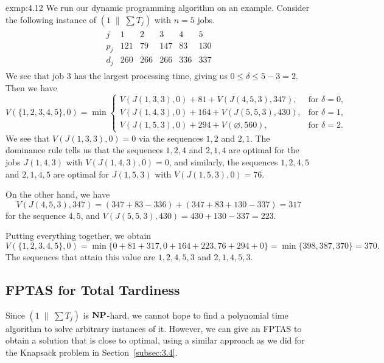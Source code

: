 \begin{exmp}{exmp:4.12}
    We run our dynamic programming algorithm on an example. Consider 
    the following instance of $(1\;\|\;\sum T_j)$ with $n = 5$ jobs. 
    \begin{align*}
        \begin{array}{c|ccccc}
            j & 1 & 2 & 3 & 4 & 5 \\ \hline 
            p_j & 121 & 79 & 147 & 83 & 130 \\ 
            d_j & 260 & 266 & 266 & 336 & 337 
        \end{array}
    \end{align*}
    We see that job $3$ has the largest processing time, giving us 
    $0 \leq \delta \leq 5 - 3 = 2$. Then we have 
    \[ V(\{1, 2, 3, 4, 5\}, 0) = \min\begin{cases} 
        V(J(1, 3, 3), 0) + 81 + V(J(4, 5, 3), 347), & \text{for } \delta = 0, \\ 
        V(J(1, 4, 3), 0) + 164 + V(J(5, 5, 3), 430), & \text{for } \delta = 1, \\ 
        V(J(1, 5, 3), 0) + 294 + V(\varnothing, 560), & \text{for } \delta = 2. 
    \end{cases} \] 
    We see that $V(J(1, 3, 3), 0) = 0$ via the sequences $1, 2$ and $2, 1$. 
    The dominance rule tells us that the sequences $1, 2, 4$ and $2, 1, 4$ 
    are optimal for the jobs $J(1, 4, 3)$ with $V(J(1, 4, 3), 0) = 0$, 
    and similarly, the sequences $1, 2, 4, 5$ and $2, 1, 4, 5$ are optimal for 
    $J(1, 5, 3)$ with $V(J(1, 5, 3), 0) = 76$.

    On the other hand, we have 
    \[ V(J(4, 5, 3), 347) = (347 + 83 - 336) + (347 + 83 + 130 - 337) = 317 \] 
    for the sequence $4, 5$, and $V(J(5, 5, 3), 430) = 430 + 130 - 337 = 223$.

    Putting everything together, we obtain 
    \[ V(\{1, 2, 3, 4, 5\}, 0) = 
    \min\{0 + 81 + 317, 0 + 164 + 223, 76 + 294 + 0\}
    = \min\{398, 387, 370\} = 370. \] 
    The sequences that attain this value are $1, 2, 4, 5, 3$ and $2, 1, 4, 5, 3$.    
\end{exmp}

\subsection{FPTAS for Total Tardiness} \label{subsec:4.3}
Since $(1\;\|\;\sum T_j)$ is $\operatorname{\textbf{NP}}$-hard, we cannot hope to find a polynomial 
time algorithm to solve arbitrary instances of it. However, we can give an FPTAS
to obtain a solution that is close to optimal, using a similar approach 
as we did for the {\sc Knapsack} problem in Section~\ref{subsec:3.4}. 


